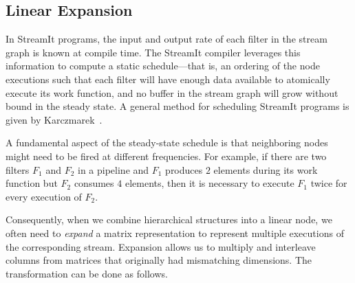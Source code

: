 \documentclass{sig-alternate}
\begin{document}
\subsection{Linear Expansion}

In StreamIt programs, the input and output rate of each filter in the
stream graph is known at compile time.  The StreamIt compiler
leverages this information to compute a static schedule---that is, an
ordering of the node executions such that each filter will have enough
data available to atomically execute its work function, and no
buffer in the stream graph will grow without bound in the steady
state.  A general method for scheduling StreamIt programs is given by
Karczmarek~\cite{karczma-thesis}.

A fundamental aspect of the steady-state schedule is that neighboring
nodes might need to be fired at different frequencies.  For example,
if there are two filters $F_1$ and $F_2$ in a pipeline and
$F_1$ produces $2$ elements during its work function but $F_2$
consumes $4$ elements, then it is necessary to execute $F_1$ twice for
every execution of $F_2$.


Consequently, when we combine hierarchical structures into a linear
node, we often need to {\it expand} a matrix representation to
represent multiple executions of the corresponding stream.  Expansion
allows us to multiply and interleave columns from matrices
that originally had mismatching dimensions.  The transformation can be
done as follows.

\end{document}
